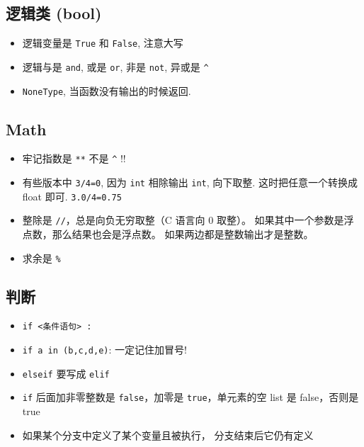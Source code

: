 \subsection{逻辑类 (bool)}
\begin{itemize}
\item 逻辑变量是 \verb`True` 和 \verb`False`, 注意大写
\item 逻辑与是 \verb`and`, 或是 \verb`or`, 非是 \verb`not`, 异或是 \verb`^`
\item \verb`NoneType`, 当函数没有输出的时候返回.
\end{itemize}

\subsection{Math}
\begin{itemize}
\item 牢记指数是 \verb`**` 不是 \verb`^` !!
\item 有些版本中 \verb`3/4=0`, 因为 \verb`int` 相除输出 \verb`int`, 向下取整. 这时把任意一个转换成 float 即可. \verb`3.0/4=0.75`
\item 整除是 \verb`//`，总是向负无穷取整（C 语言向 0 取整）。 如果其中一个参数是浮点数，那么结果也会是浮点数。 如果两边都是整数输出才是整数。
\item 求余是 \verb`%`
\end{itemize}

\subsection{判断}
\begin{itemize}
\item \verb`if <条件语句> :`
\item \verb`if a in (b,c,d,e)`:   一定记住加冒号!
\item \verb`elseif` 要写成 \verb`elif`
\item \verb`if` 后面加非零整数是 \verb`false`，加零是 \verb`true`，单元素的空 list 是 false，否则是 true
\item 如果某个分支中定义了某个变量且被执行， 分支结束后它仍有定义
\end{itemize}

